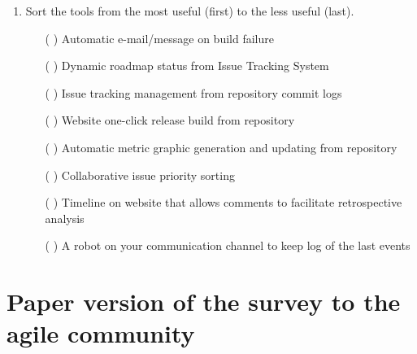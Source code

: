 \documentclass[lnbip]{svmultln}
\begin{document}
\begin{small}
\begin{enumerate}
  \item Sort the tools from the most useful (first) to the less useful
    (last).
    \begin{itemize}
    \item[( ) ] Automatic e-mail/message on build failure
    \item[( ) ] Dynamic roadmap status from Issue Tracking System
    \item[( ) ] Issue tracking management from repository commit logs
    \item[( ) ] Website one-click release build from repository
    \item[( ) ] Automatic metric graphic generation and updating from
      repository
    \item[( ) ] Collaborative issue priority sorting
    \item[( ) ] Timeline on website that allows comments to facilitate
      retrospective analysis
    \item[( ) ] A robot on your communication channel to keep log of
      the last events
    \end{itemize}
  \end{enumerate}
\end{small}

\section{Paper version of the survey to the agile community}
\label{appendix:b}
\end{document}
